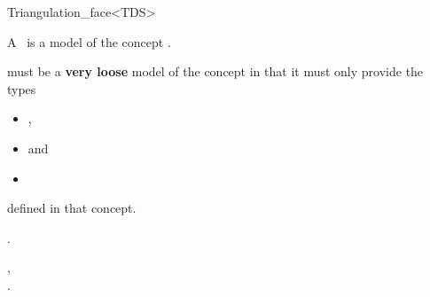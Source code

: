 \begin{ccRefClass}{Triangulation_face<TDS>}

\ccDefinition

A \ccRefName\ is a model of the concept .

\ccParameters

 must be a \textbf{very loose} model of the concept
 in that it must only provide the
types\begin{itemize}
\item {},
\item {} and
\item {}\end{itemize} defined in that concept.


\ccIsModel

.

\ccSeeAlso

,\\
.

\end{ccRefClass}
